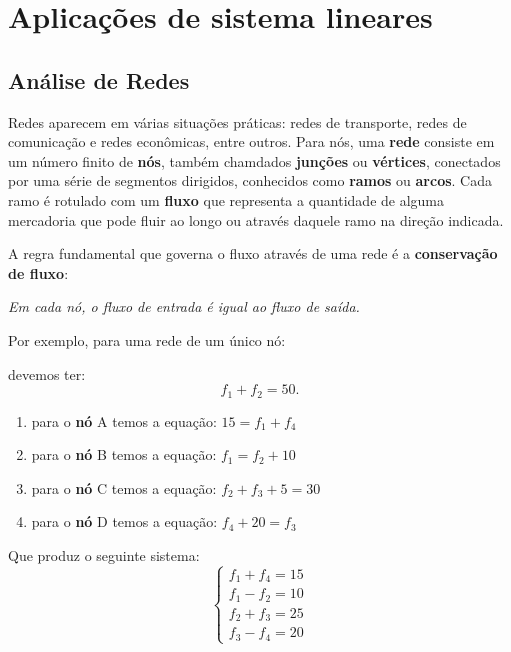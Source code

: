 \section{Aplicações de sistema lineares}

\subsection{Análise de Redes}

Redes aparecem em várias situações práticas: redes de transporte, redes de comunicação e redes econômicas, entre outros. Para nós, uma \textbf{rede} consiste em um número finito de \textbf{nós}, também chamdados \textbf{junções} ou \textbf{vértices}, conectados por uma série de segmentos dirigidos, conhecidos como \textbf{ramos} ou \textbf{arcos}. Cada ramo é rotulado com um \textbf{fluxo} que representa a quantidade de alguma mercadoria  que pode fluir ao longo ou através daquele ramo na direção indicada.

A regra fundamental que governa o fluxo através de uma rede é a \textbf{conservação de fluxo}:

\begin{definicao}
  \textit{Em cada nó, o fluxo de entrada é igual ao fluxo de saída.}
\end{definicao}

Por exemplo, para uma rede de um único nó:
\begin{figure}[!h]
    \centering
    
\end{figure}
devemos ter:
\[
    f_1 + f_2 = 50.
\]

\begin{figure}[!h]
    \centering
    
\end{figure}

\begin{enumerate}[label={\roman*})]
    \item para o \textbf{nó} A temos a equação: $15 = f_1 + f_4$
    \item para o \textbf{nó} B temos a equação: $f_1 = f_2 + 10$
    \item para o \textbf{nó} C temos a equação: $f_2 + f_3 + 5 = 30$
    \item para o \textbf{nó} D temos a equação: $f_4 + 20 = f_3$
\end{enumerate}

Que produz o seguinte sistema:
\[
    \begin{cases}
        f_1 + f_4 = 15\\
        f_1 - f_2 = 10\\
        f_2 + f_3 = 25\\
        f_3 - f_4 = 20
    \end{cases}
\]

